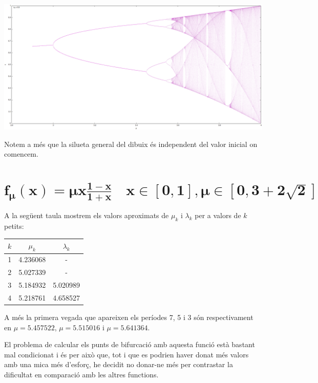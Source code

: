 \documentclass[a4paper]{article}
\theoremstyle{definition}
\begin{document}
\begin{center}
  \begin{minipage}{\linewidth}
    \centering
    \includegraphics[width=0.8\linewidth]{Images/map1.png}
  \end{minipage}
\end{center}
Notem a més que la silueta general del dibuix és independent del valor inicial on comencem.

\newpage
\section{\texorpdfstring{$\boldsymbol{f_\mu(x)=\mu x\frac{1-x}{1+x}\quad x\in[0,1], \mu\in[0,3+2\sqrt{2}]}$}{f2}}
A la següent taula mostrem els valors aproximats de $\mu_k$ i $\lambda_k$ per a valors de $k$ petits:
\begin{table}[ht]
  \centering
  \begin{tabular}{c|c|c}
    $k$ & $\mu_k$  & $\lambda_k$ \\
    \hline
    \hline
    1   & 4.236068 & -           \\
    2   & 5.027339 & -           \\
    3   & 5.184932 & 5.020989    \\
    4   & 5.218761 & 4.658527
  \end{tabular}
\end{table}

A més la primera vegada que apareixen els períodes 7, 5 i 3 són respectivament en $\mu = 5.457522$, $\mu= 5.515016$ i $\mu = 5.641364$.

El problema de calcular els punts de bifurcació amb aquesta funció està bastant mal condicionat i és per això que, tot i que es podrien haver donat més valors amb una mica més d'esforç, he decidit no donar-ne més per contrastar la dificultat en comparació amb les altres functions.
\end{document}

